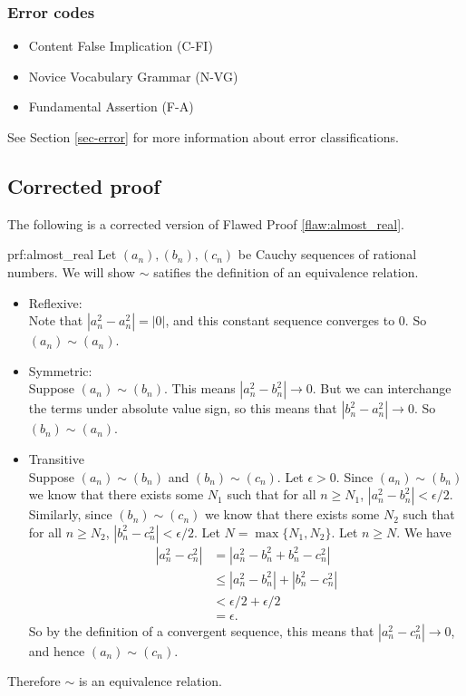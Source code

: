 \subsubsection{Error codes}
\begin{itemize}
    \item Content False Implication (C-FI)
    \item Novice Vocabulary Grammar (N-VG)
    \item Fundamental Assertion (F-A)
\end{itemize}
See Section \ref{sec-error} for more information about error classifications.

\clearpage
\subsection{Corrected proof}

The following is a corrected version of Flawed Proof \ref{flaw:almost_real}. %

\begin{prf}{prf:almost_real} %
Let $(a_n), (b_n), (c_n)$ be Cauchy sequences of rational numbers. We will show $\sim$ satifies the definition of an equivalence relation.
\begin{itemize}
    \item Reflexive:\\
    Note that $|a^2_n - a^2_n| = |0|$, and this constant sequence converges to $0$. So $(a_n) \sim (a_n)$.
    \item Symmetric:\\
    Suppose $(a_n) \sim (b_n)$. This means $|a^2_n - b^2_n| \to 0$. But we can interchange the terms under absolute value sign, so this means that $|b^2_n - a^2_n| \to 0$. So $(b_n) \sim (a_n)$.
    \item Transitive \\
    Suppose $(a_n) \sim (b_n)$ and $(b_n) \sim (c_n)$. Let $\epsilon > 0$. Since $(a_n) \sim (b_n)$ we know that there exists some $N_1$ such that for all $n \geq N_1$, $|a_n^2 - b_n^2| < \epsilon/2$. Similarly, since $(b_n) \sim (c_n)$ we know that there exists some $N_2$ such that for all $n \geq N_2$, $|b_n^2 - c_n^2| < \epsilon/2$. Let $N = \max\{N_1, N_2\}$. Let $n \geq N$. We have
    \begin{align*}
        |a_n^2 - c_n^2| &= |a_n^2 -b_n^2 + b_n^2 - c_n^2| \\ &\leq |a_n^2 - b_n^2| + |b_n^2 - c_n^2| \\ &< \epsilon/2 + \epsilon/2 \\ &= \epsilon.
    \end{align*}
    So by the definition of a convergent sequence, this means that $|a_n^2 - c_n^2| \to 0$, and hence $(a_n) \sim (c_n)$.
\end{itemize}
Therefore $\sim$ is an equivalence relation.
\end{prf} 